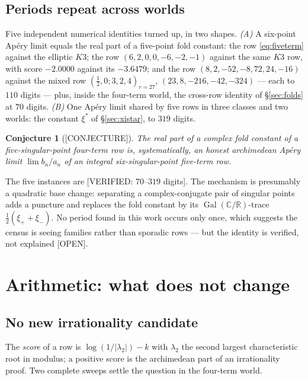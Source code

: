\documentclass[11pt,reqno]{amsart}
\theoremstyle{plain}
\newtheorem{conjecture}[theorem]{Conjecture}
\theoremstyle{definition}
\theoremstyle{remark}
\theoremstyle{plain}
\newcommand{\R}{\mathbb{R}}
\newcommand{\C}{\mathbb{C}}
\DeclareMathOperator{\Gal}{Gal}
\newcommand{\Verified}[1]{\textup{\textsf{[VERIFIED: #1]}}}
\newcommand{\Conj}{\textup{\textsf{[CONJECTURE]}}}
\newcommand{\Open}{\textup{\textsf{[OPEN]}}}
\begin{document}
\subsection{Periods repeat across worlds}
Five independent numerical identities turned up, in two shapes. \emph{(A)} A
six-point Ap\'ery limit equals the real part of a five-point fold constant: the
row \eqref{eq:fiveterm} against the elliptic $K3$; the row $(6,2,0,0,-6,-2,-1)$
against the same $K3$ row, with score $-2.0000$ against its $-3.6479$; and the
row $(8,2,-52,-8,72,24,-16)$ against the mixed row $(\tfrac12,0;3,2,4)_{r=27}$,
$(23,8,-216,-42,-324)$ --- each to $110$ digits --- plus, inside the four-term
world, the cross-row identity of \S\ref{sec:folds} at $70$ digits.
\emph{(B)} One Ap\'ery limit shared by five rows in three classes and two
worlds: the constant $\xi^*$ of \S\ref{sec:xistar}, to $319$ digits.

\begin{conjecture}[\Conj]\label{conj:D6}
The real part of a complex fold constant of a five-singular-point four-term row
is, systematically, an honest archimedean Ap\'ery limit $\lim b_n/a_n$ of an
integral six-singular-point five-term row.
\end{conjecture}

The five instances are \Verified{$70$--$319$ digits}. The mechanism is
presumably a quadratic base change: separating a complex-conjugate pair of
singular points adds a puncture and replaces the fold constant by its
$\Gal(\C/\R)$-trace $\tfrac12(\xi_++\xi_-)$. No period found in this work occurs
only once, which suggests the census is seeing families rather than sporadic rows
--- but the identity is verified, not explained \Open.

\section{Arithmetic: what does not change}\label{sec:arith}

\subsection{No new irrationality candidate}
The \emph{score} of a row is $\log(1/|\lambda_2|)-k$ with $\lambda_2$ the second
largest characteristic root in modulus; a positive score is the archimedean part
of an irrationality proof. Two complete sweeps settle the question in the
four-term world.
\end{document}

